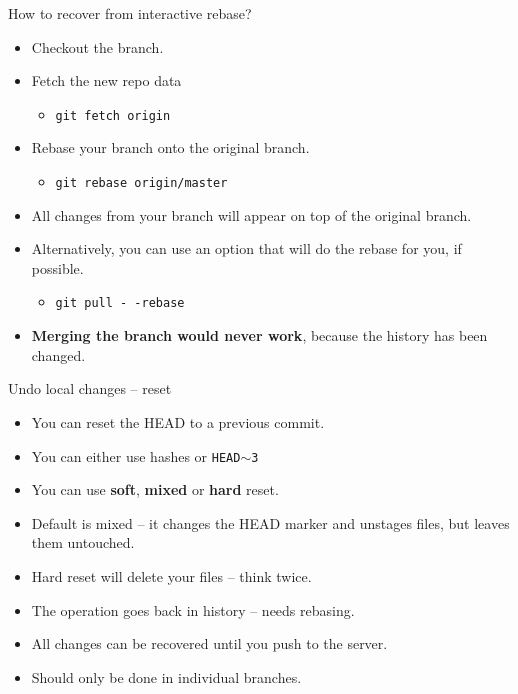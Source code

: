 \documentclass[14pt]{beamer}
\begin{document}
	\begin{frame}{How to recover from interactive rebase?}
	\begin{itemize}
		\item Checkout the branch.
		\item Fetch the new repo data 
		\begin{itemize}
			\item \texttt{git fetch origin}
		\end{itemize}
		\item Rebase your branch onto the original branch.
		\begin{itemize}
			\item \texttt{git rebase origin/master}
		\end{itemize}
		\item All changes from your branch will appear on top of the original branch.
		\item Alternatively, you can use an option that will do the rebase for you, if possible.
		\begin{itemize}
			\item \texttt{git pull -\,-rebase}
		\end{itemize}
		\item \textbf{Merging the branch would never work}, because the history has been changed.
	\end{itemize}
\end{frame}

\begin{frame}{Undo local changes -- reset}
	\begin{itemize}
		\item You can reset the HEAD to a previous commit.
		\item You can either use hashes or \texttt{HEAD$\sim$3}
		\item You can use \textbf{soft}, \textbf{mixed} or \textbf{hard} reset.
		\item Default is mixed -- it changes the HEAD marker and unstages files, but leaves them untouched.
		\item Hard reset will delete your files -- think twice.
		\item The operation goes back in history -- needs rebasing.
		\item All changes can be recovered until you push to the server.
		\item Should only be done in individual branches.
	\end{itemize}
\end{frame}
\end{document}
